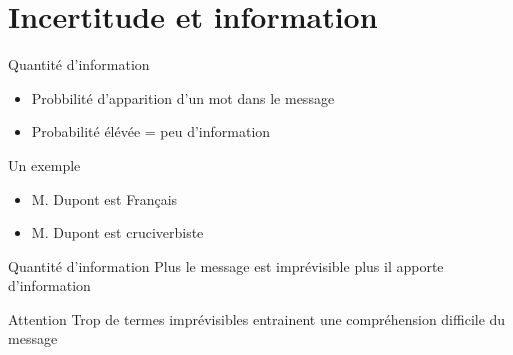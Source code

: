 \section{Incertitude et information}

\begin{frame}
	\begin{block}{Quantité d'information}
		\begin{itemize}
			\item{Probbilité d'apparition d'un mot dans le message}
			\item{Probabilité élévée = peu d'information}
		\end{itemize}
	\end{block} \pause
	
	\begin{exampleblock}{Un exemple}
		\begin{itemize}
			\item{M. Dupont est Français} \pause
			\item{M. Dupont est cruciverbiste}
		\end{itemize}
	\end{exampleblock}
\end{frame}

\begin{frame}
	\begin{block}{Quantité d'information}
		Plus le message est imprévisible plus il apporte d'information
	\end{block} \pause
	
	\begin{alertblock}{Attention}
		Trop de termes imprévisibles entrainent une compréhension difficile du message
	\end{alertblock}
\end{frame}
